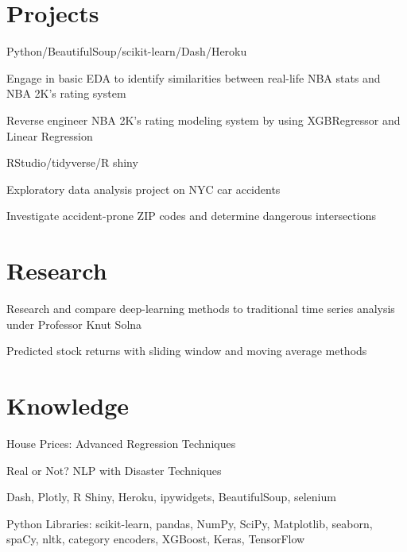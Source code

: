 \documentclass[]{deedy-resume-openfont}
\begin{document}
\begin{minipage}[t]{0.66\textwidth}

\section{Projects}
\location{}
\begin{tightemize} 
\item Python/BeautifulSoup/scikit-learn/Dash/Heroku 
\item Engage in basic EDA to identify similarities between real-life NBA stats and NBA 2K's rating system
\item Reverse engineer NBA 2K's rating modeling system by using XGBRegressor and Linear Regression
\end{tightemize}
\location{}
\begin{tightemize} 
\item RStudio/tidyverse/R shiny
\item Exploratory data analysis project on NYC car accidents 
\item Investigate accident-prone ZIP codes and determine dangerous intersections
\end{tightemize}
\sectionsep


\section{Research}
\begin{tightemize} 
\item Research and compare deep-learning methods to traditional time series analysis under Professor Knut Solna
\item Predicted stock returns with sliding window and moving average methods
\end{tightemize}
\sectionsep

\section{Knowledge}
\location{}
\begin{tightemize} 
\item House Prices: Advanced Regression Techniques
\item Real or Not? NLP with Disaster Techniques 
\end{tightemize}
\location{}
\begin{tightemize}
\item Dash, Plotly, R Shiny, Heroku, ipywidgets, BeautifulSoup, selenium
\item Python Libraries: scikit-learn, pandas, NumPy, SciPy, Matplotlib, seaborn, spaCy, nltk, category encoders, XGBoost, Keras, TensorFlow 
\end{tightemize}
\sectionsep



\end{minipage} 
\end{document}
